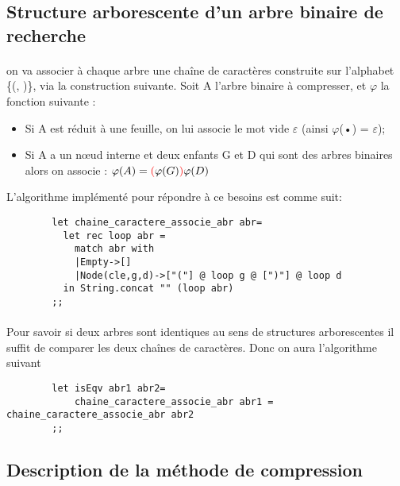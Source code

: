     \subsection{Structure arborescente d'un arbre binaire de recherche}
     \paragraph{}
     on va associer à chaque arbre une chaîne de caractères construite sur l’alphabet \{\color{red}(\color{black}, \color{red})\color{black}\}, via la construction suivante. Soit A l’arbre binaire à compresser, et $\varphi$ la fonction suivante :
     \begin{itemize}
         \item Si A est réduit à une feuille, on lui associe le mot vide $\varepsilon$ (ainsi $\varphi$(•) = $\varepsilon$);
         \item Si A a un nœud interne et deux enfants G et D qui sont des arbres binaires alors on associe : 
         \tabto{4.5cm}$\varphi(A) = \color{red}(\color{black}\varphi(G)\color{red})\color{black}\varphi(D)$
     \end{itemize}
     L'algorithme implémenté pour répondre à ce besoins est comme suit:
     \begin{verbatim} 
        let chaine_caractere_associe_abr abr=
          let rec loop abr =
            match abr with
            |Empty->[]
            |Node(cle,g,d)->["("] @ loop g @ [")"] @ loop d
          in String.concat "" (loop abr)
        ;;  
    \end{verbatim}
    \paragraph{}
    Pour savoir si deux arbres sont identiques au sens de structures arborescentes il suffit de comparer les deux chaînes de caractères. Donc on aura l'algorithme suivant
     \begin{verbatim} 
        let isEqv abr1 abr2=
            chaine_caractere_associe_abr abr1 = chaine_caractere_associe_abr abr2
        ;;
    \end{verbatim}
    \subsection{Description de la méthode de compression}
